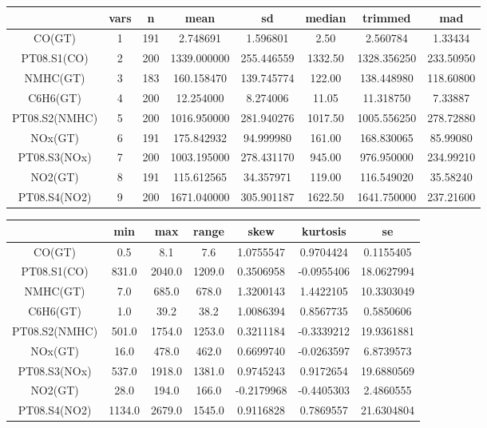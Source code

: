 \begin{table}[h]
  \centering
  \begin{tabular}{|c|c|c|c|c|c|c|c|}
    \hline
      & vars & n & mean & sd & median & trimmed & mad\\
    \hline
    CO(GT) & 1 & 191 & 2.748691 & 1.596801 & 2.50 & 2.560784 & 1.33434\\
    \hline
    PT08.S1(CO) & 2 & 200 & 1339.000000 & 255.446559 & 1332.50 & 1328.356250 & 233.50950\\
    \hline
    NMHC(GT) & 3 & 183 & 160.158470 & 139.745774 & 122.00 & 138.448980 & 118.60800\\
    \hline
    C6H6(GT) & 4 & 200 & 12.254000 & 8.274006 & 11.05 & 11.318750 & 7.33887\\
    \hline
    PT08.S2(NMHC) & 5 & 200 & 1016.950000 & 281.940276 & 1017.50 & 1005.556250 & 278.72880\\
    \hline
    NOx(GT) & 6 & 191 & 175.842932 & 94.999980 & 161.00 & 168.830065 & 85.99080\\
    \hline
    PT08.S3(NOx) & 7 & 200 & 1003.195000 & 278.431170 & 945.00 & 976.950000 & 234.99210\\
    \hline
    NO2(GT) & 8 & 191 & 115.612565 & 34.357971 & 119.00 & 116.549020 & 35.58240\\
    \hline
    PT08.S4(NO2) & 9 & 200 & 1671.040000 & 305.901187 & 1622.50 & 1641.750000 & 237.21600\\
    \hline
  \end{tabular}

  \begin{tabular}{|c|c|c|c|c|c|c|}
    \hline
      & min & max & range & skew & kurtosis & se\\
    \hline
    CO(GT) & 0.5 & 8.1 & 7.6 & 1.0755547 & 0.9704424 & 0.1155405\\
    \hline
    PT08.S1(CO) & 831.0 & 2040.0 & 1209.0 & 0.3506958 & -0.0955406 & 18.0627994\\
    \hline
    NMHC(GT) & 7.0 & 685.0 & 678.0 & 1.3200143 & 1.4422105 & 10.3303049\\
    \hline
    C6H6(GT) & 1.0 & 39.2 & 38.2 & 1.0086394 & 0.8567735 & 0.5850606\\
    \hline
    PT08.S2(NMHC) & 501.0 & 1754.0 & 1253.0 & 0.3211184 & -0.3339212 & 19.9361881\\
    \hline
    NOx(GT) & 16.0 & 478.0 & 462.0 & 0.6699740 & -0.0263597 & 6.8739573\\
    \hline
    PT08.S3(NOx) & 537.0 & 1918.0 & 1381.0 & 0.9745243 & 0.9172654 & 19.6880569\\
    \hline
    NO2(GT) & 28.0 & 194.0 & 166.0 & -0.2179968 & -0.4405303 & 2.4860555\\
    \hline
    PT08.S4(NO2) & 1134.0 & 2679.0 & 1545.0 & 0.9116828 & 0.7869557 & 21.6304804\\
    \hline
  \end{tabular}
\end{table}

